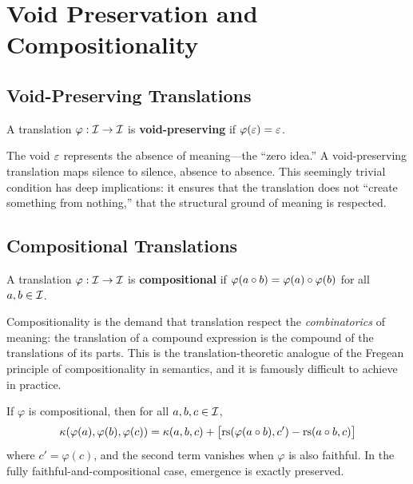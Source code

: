 \section{Void Preservation and Compositionality}
\label{sec:translation:compositional}

\subsection{Void-Preserving Translations}

\begin{definition}
\label{def:void-preserving}
A translation $\varphi : \mathcal{I} \to \mathcal{I}$ is \textbf{void-preserving} if
$\varphi(\varepsilon) = \varepsilon$.
\end{definition}

The void $\varepsilon$ represents the absence of meaning---the ``zero idea.''  A
void-preserving translation maps silence to silence, absence to absence.
This seemingly trivial condition has deep implications: it ensures that the
translation does not ``create something from nothing,'' that the structural
ground of meaning is respected.

\subsection{Compositional Translations}

\begin{definition}
\label{def:compositional}
A translation $\varphi : \mathcal{I} \to \mathcal{I}$ is \textbf{compositional} if
$\varphi(a \circ b) = \varphi(a) \circ \varphi(b)$ for all
$a, b \in \mathcal{I}$.
\end{definition}

Compositionality is the demand that translation respect the
\emph{combinatorics} of meaning: the translation of a compound expression
is the compound of the translations of its parts.  This is the
translation-theoretic analogue of the Fregean principle of compositionality
in semantics, and it is famously difficult to achieve in practice.

\begin{theorem}
\label{thm:compositional-zero-emergence}
If $\varphi$ is compositional, then for all $a, b, c \in \mathcal{I}$,
\[
  \kappa(\varphi(a), \varphi(b), \varphi(c))
    = \kappa(a, b, c)
    + \bigl[\mathrm{rs}(\varphi(a \circ b), c') - \mathrm{rs}(a \circ b, c)\bigr]
\]
where $c' = \varphi(c)$, and the second term vanishes when $\varphi$ is
also faithful.  In the fully faithful-and-compositional case,
emergence is exactly preserved.
\end{theorem}

